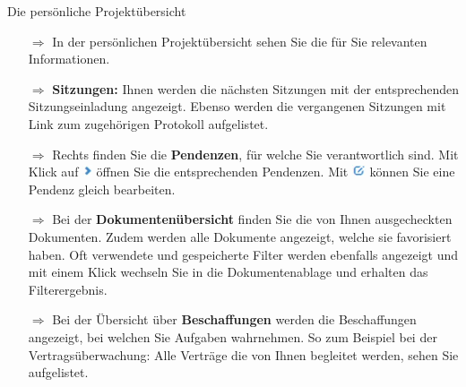 \documentclass{article}
\begin{document}
\begin{beamerlikethm}{Die persönliche Projektübersicht}
\begin{itemize}
 \item[$\Longrightarrow$] In der persönlichen Projektübersicht sehen Sie die für Sie relevanten Informationen.
 \item[$\Longrightarrow$] \textbf{Sitzungen:} Ihnen werden die nächsten Sitzungen mit der entsprechenden Sitzungseinladung angezeigt. Ebenso werden die vergangenen Sitzungen mit Link zum zugehörigen Protokoll aufgelistet.
 \item[$\Longrightarrow$] Rechts finden Sie die \textbf{Pendenzen}, für welche Sie verantwortlich sind. Mit Klick auf \includegraphics[height=10pt]{Icons/Pfeil_rechts.jpg} öffnen Sie die entsprechenden Pendenzen. Mit \includegraphics[height=10pt]{Icons/bearbeiten.jpg} können Sie eine Pendenz gleich bearbeiten.
 \item[$\Longrightarrow$] Bei der \textbf{Dokumentenübersicht} finden Sie die von Ihnen ausgecheckten Dokumenten. Zudem werden alle Dokumente angezeigt, welche sie favorisiert haben. Oft verwendete und gespeicherte Filter werden ebenfalls angezeigt und mit einem Klick wechseln Sie in die Dokumentenablage und erhalten das Filterergebnis.
 \item[$\Longrightarrow$] Bei der Übersicht über \textbf{Beschaffungen} werden die Beschaffungen angezeigt, bei welchen Sie Aufgaben wahrnehmen. So zum Beispiel bei der Vertragsüberwachung: Alle Verträge die von Ihnen begleitet werden, sehen Sie aufgelistet.
\end{itemize}
\end{beamerlikethm}

\end{document}
